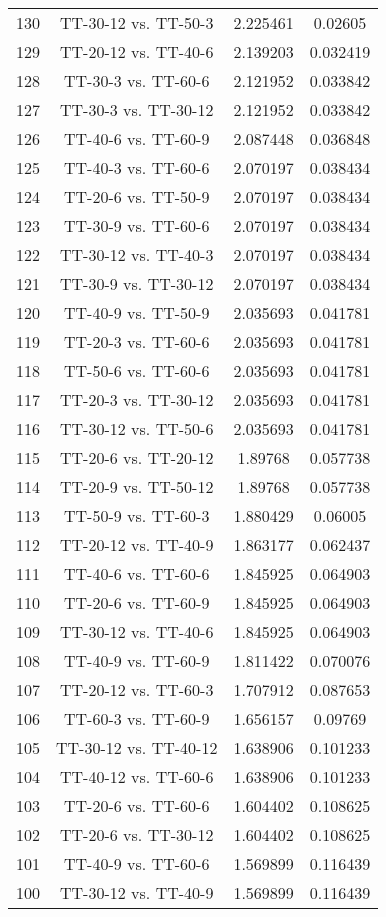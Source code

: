 \documentclass[a4paper,10pt]{article}
\begin{document}
\begin{landscape}
\begin{table}[!htp]
\begin{tabular}{cccc}
130&TT-30-12 vs. TT-50-3&2.225461&0.02605\\
129&TT-20-12 vs. TT-40-6&2.139203&0.032419\\
128&TT-30-3 vs. TT-60-6&2.121952&0.033842\\
127&TT-30-3 vs. TT-30-12&2.121952&0.033842\\
126&TT-40-6 vs. TT-60-9&2.087448&0.036848\\
125&TT-40-3 vs. TT-60-6&2.070197&0.038434\\
124&TT-20-6 vs. TT-50-9&2.070197&0.038434\\
123&TT-30-9 vs. TT-60-6&2.070197&0.038434\\
122&TT-30-12 vs. TT-40-3&2.070197&0.038434\\
121&TT-30-9 vs. TT-30-12&2.070197&0.038434\\
120&TT-40-9 vs. TT-50-9&2.035693&0.041781\\
119&TT-20-3 vs. TT-60-6&2.035693&0.041781\\
118&TT-50-6 vs. TT-60-6&2.035693&0.041781\\
117&TT-20-3 vs. TT-30-12&2.035693&0.041781\\
116&TT-30-12 vs. TT-50-6&2.035693&0.041781\\
115&TT-20-6 vs. TT-20-12&1.89768&0.057738\\
114&TT-20-9 vs. TT-50-12&1.89768&0.057738\\
113&TT-50-9 vs. TT-60-3&1.880429&0.06005\\
112&TT-20-12 vs. TT-40-9&1.863177&0.062437\\
111&TT-40-6 vs. TT-60-6&1.845925&0.064903\\
110&TT-20-6 vs. TT-60-9&1.845925&0.064903\\
109&TT-30-12 vs. TT-40-6&1.845925&0.064903\\
108&TT-40-9 vs. TT-60-9&1.811422&0.070076\\
107&TT-20-12 vs. TT-60-3&1.707912&0.087653\\
106&TT-60-3 vs. TT-60-9&1.656157&0.09769\\
105&TT-30-12 vs. TT-40-12&1.638906&0.101233\\
104&TT-40-12 vs. TT-60-6&1.638906&0.101233\\
103&TT-20-6 vs. TT-60-6&1.604402&0.108625\\
102&TT-20-6 vs. TT-30-12&1.604402&0.108625\\
101&TT-40-9 vs. TT-60-6&1.569899&0.116439\\
100&TT-30-12 vs. TT-40-9&1.569899&0.116439\\

\end{tabular}
\end{table}
\end{landscape}
\end{document}
